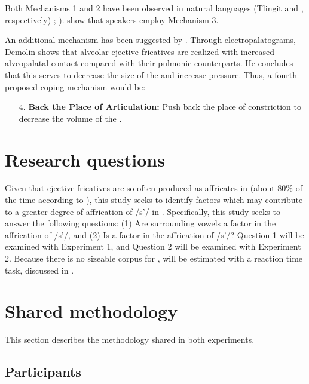 \documentclass[output=paper,newtxmath,modfonts,nonflat,final]{langsci/langscibook}
\begin{document}
Both Mechanisms 1 and 2 have been observed in natural languages (Tlingit and , respectively) \citealt{MaddiesonEtAl2001}; \citealt{maddieson1998make}). \citet{shosted2011affricating} show that  speakers employ Mechanism 3.

An additional mechanism has been suggested by \citet{demolin2002search}. Through electropalatograms, Demolin shows that  alveolar ejective fricatives are realized with increased alveopalatal contact compared with their pulmonic counterparts. He concludes that this serves to decrease the size of the  and increase pressure. Thus, a fourth proposed coping mechanism would be:

\begin{enumerate}
	\item[4.] \textbf{Back the Place of Articulation:} Push back the place of constriction to decrease the volume of the  \citep{demolin2002search}.
\end{enumerate}
	
\section{Research questions}\label{sec:moeng:3}

Given that ejective fricatives are so often produced as affricates in  (about 80\% of the time according to \citealt{shosted2011affricating}), this study seeks to identify factors which may contribute to a greater degree of affrication of /s’/ in . Specifically, this study seeks to answer the following questions: (1) Are surrounding vowels a factor in the affrication of /s’/, and (2) Is  a factor in the affrication of /s’/? Question 1 will be examined with Experiment 1, and Question 2 will be examined with Experiment 2. Because there is no sizeable corpus for ,  will be estimated with a reaction time task, discussed in .

\section{Shared methodology}\label{sec:moeng:4}

This section describes the methodology shared in both experiments.

\subsection{Participants}\label{sec:moeng:4.1}
\end{document}
